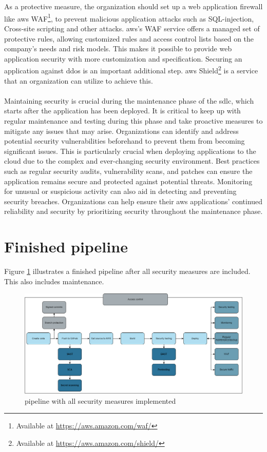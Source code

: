\\~\\
As a protective measure, the organization should set up a web application firewall like \acrshort{aws} WAF\footnote{Available at \url{https://aws.amazon.com/waf/}}, to prevent malicious application attacks such as \gls{SQL-injection}, \gls{Cross-site scripting} and other attacks. \acrshort{aws}'s WAF service offers a managed set of protective rules, allowing customized rules and access control lists based on the company's needs and risk models. This makes it possible to provide web application security with more customization and specification. Securing an application against \gls{ddos} is an important additional step. \acrshort{aws} Shield\footnote{Available at \url{https://aws.amazon.com/shield/}} is a service that an organization can utilize to achieve this. 
\\~\\
Maintaining security is crucial during the maintenance phase of the \acrshort{sdlc}, which starts after the application has been deployed. It is critical to keep up with regular maintenance and testing during this phase and take proactive measures to mitigate any issues that may arise. Organizations can identify and address potential security vulnerabilities beforehand to prevent them from becoming significant issues. This is particularly crucial when deploying applications to the cloud due to the complex and ever-changing security environment. Best practices such as regular security audits, vulnerability scans, and patches can ensure the application remains secure and protected against potential threats. Monitoring for unusual or suspicious activity can also aid in detecting and preventing security breaches. Organizations can help ensure their \acrshort{aws} applications' continued reliability and security by prioritizing security throughout the maintenance phase.


\section{Finished pipeline}
Figure \ref{fig: Pipeline with all security measures implemented} illustrates a finished pipeline after all security measures are included. This also includes maintenance.  

\vspace{2mm}
\begin{figure}[H]
    \centering
    \includegraphics[width=0.8\columnwidth]{Images/FinalPipeline.png}
    \caption{\gls{pipeline} with all security measures implemented}
    \label{fig: Pipeline with all security measures implemented}
\end{figure}



